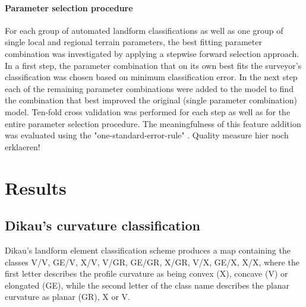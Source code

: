 \documentclass[final,1p,times,twocolumn,authoryear]{elsarticle}
\begin{document}
\paragraph{Parameter selection procedure} For each group of automated landform classifications as well as one group of single local and regional terrain parameters, the best fitting parameter combination was investigated by applying a stepwise forward selection approach. In a first step, the parameter combination that on its own best fits the surveyor's classification was chosen based on minimum classification error. In the next step each of the remaining parameter combinations were added to the model to find the combination that best improved the original (single parameter combination) model. Ten-fold cross validation was performed for each step as well as for the entire parameter selection procedure. The meaningfulness of this feature addition was evaluated using the "one-standard-error-rule" \citep{James2013}. 
Quality measure hier noch erklaeren!
\section{Results}
\subsection{Dikau's curvature classification}
Dikau's landform element classification scheme produces a map containing the classes V/V, GE/V, X/V, V/GR, GE/GR, X/GR, V/X, GE/X, X/X, where the first letter describes the profile curvature as being convex (X), concave (V) or elongated (GE), while the second letter of the class name describes the planar curvature as planar (GR), X or V.
\end{document}
